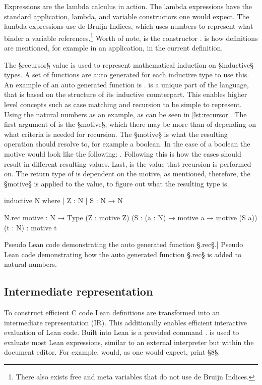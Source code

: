 Expressions are the lambda calculus in action.
The lambda expressions have the standard application, lambda, and variable constructors one would expect.
The lambda expressions use de Bruijn Indices, which uses numbers to represent what binder a variable references.\footnote{There also exists free and meta variables that do not use de Bruijn Indices.}
Worth of note, is the constructor .
 is how definitions are mentioned, for example in an application, in the current definition.

The §recursor§ value is used to represent mathematical induction on §inductive§ types.
A set of functions are auto generated for each inductive type to use this. An example of an auto generated function is .
 is a unique part of the language, that is based on the structure of its inductive counterpart.
This enables higher level concepts such as case matching and recursion to be simple to represent.
Using the natural numbers as an example, as can be seen in \cref{lst:recursor}.
The first argument of  is the §motive§, which there may be more than of depending on what criteria is needed for recursion.
The §motive§ is what the resulting operation should resolve to, for example a boolean.
In the case of a boolean the motive would look like the following: .
Following this is how the cases should result in different resulting values.
Last, is the value that recursion is performed on.
The return type of  is dependent on the motive, as mentioned, therefore, the §motive§ is applied to the value, to figure out what the resulting type is.

\vspace{-0.4cm}
\begin{listing}[H]
\begin{LeanCode}
inductive N where
  | Z : N
  | S : N → N

N.rec {motive : N → Type}
      (Z : motive Z)
      (S : (a : N) → motive a → motive (S a))
      (t : N) :
      motive t
\end{LeanCode}
\caption
  [Pseudo Lean code demonstrating the auto generated function §.rec§.]
  {Pseudo Lean code demonstrating how the auto generated function §.rec§ is added to natural numbers.}
\label{lst:recursor}
\end{listing}

\subsection{Intermediate representation}\label{sec:lean:intermediate-representation}
To construct efficient C code Lean definitions are transformed into an intermediate representation (IR).
This additionally enables efficient interactive evaluation of Lean code.
Built into Lean is a provided command .
 is used to evaluate most Lean expressions, similar to an external interpreter but within the document editor.
For example,  would, as one would expect, print §8§.

